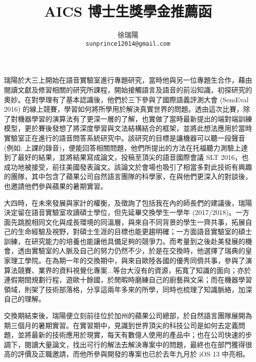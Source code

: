 \documentclass[12pt,UTF8,fntef]{article}
\title{AICS 博士生獎學金推薦函}
\author{徐瑞陽 \\ \texttt{sunprince12014@gmail.com}}
\date{}
\begin{document}
\maketitle

  瑞陽於大三上開始在語音實驗室進行專題研究，當時他與另一位專題生合作，藉由閱讀文獻及修習相關的研究所課程，開始接觸語言及語音的前沿知識，初探研究的奧妙。在對學理有了基本認識後，他們於三下參與了國際語義評測大會 (SemEval 2016) 的線上競賽，學習如何將所學用於解決真實世界的問題。透由這次比賽，除了對機器學習的演算法有了更深一層的了解，也實做了當時最新提出的端對端訓練模型，更於賽後發想了將深度學習與文法結構結合的框架，並將此想法應用於當時實驗室正在進行的語音問答系統研究中。該研究的目標是讓機器可以聽一段聲音 (例如: 上課的錄音)，便能回答相關問題，他們所提出的方法在托福聽力測驗上達到了最好的結果，並將結果寫成論文，投稿至頂尖的語音國際會議 SLT 2016，也成功地被接受，前往美國發表論文。該論文於會場也吸引了相當多對此技術有興趣的團隊，其中包含了蘋果公司自然語言團隊的科學家，在與他們更深入的對談後，也邀請他們參與蘋果的暑期實習。

\vspace{1.5em}

大四時，在未來發展與家計的權衡，及徵詢了包括我在內的師長們的建議後，瑞陽決定留在語音實驗室攻讀碩士學位，但先延畢交換學生一學年 (2017/2018)。一方面先跳脫相同文化與成長環境的同溫層，與來自不同背景的學生一齊共事，拓展自己的生命經驗及視野，對碩士生涯的目標也能更趨明確；一方面語音實驗室的碩士訓練，在研究能力的培養也能讓他具備足夠的競爭力。而考量到之後赴美發展的機會，透由實驗室的人脈及自己的努力仍然不少，於是在交換時，他選擇了瑞典的皇家理工學院。在為期一年的交換期中，與來自歐陸各國的優秀同儕共事，參與了演算法競賽、業界的資料視覺化專案...等台大沒有的資源，拓寬了知識的面向；亦於連假期間規劃行程，遊歐十餘國，於閒暇時磨練自己的廚藝與文采；而在機器學習領域，則架了技術部落格，分享這兩年多來的所學，同時也梳理了知識脈絡，加深自己的理解。

\vspace{1.5em}

交換期結束後，瑞陽便立刻前往位於加州的蘋果公司總部，於自然語言團隊展開為期三個月的暑期實習。在實習期中，見識到世界頂尖的科技公司是如何去定義問題，並將最新的技術應用於現實，每天有數億人使用的產品中；也在公司快速的步調下，閱讀大量論文，找出可行的解法去解決專案中的問題，最終也在部門獲得很高的評價及正職邀請，而他所參與開發的專案也已於去年九月於 iOS 13 中亮相。


\newpage
\end{document}
